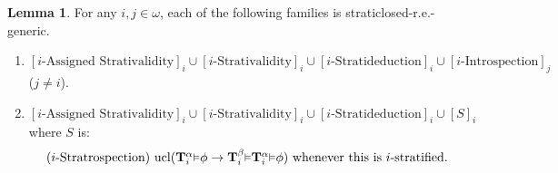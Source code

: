 \documentclass[reqno]{article}
\theoremstyle{definition}
\newtheorem{lemma}[theorem]{Lemma}
\def\T{\mathbf{T}}
\newcommand{\Prr}[2]{\T^{#1}_{#2}\mbox{\small${\vDash}$}}
\newcommand{\ucl}[1]{\mathrm{ucl}(#1)}
\begin{document}
\begin{lemma}
\label{secondutilbagintrospection}
For any $i,j\in\omega$, each of the following families is straticlosed-r.e.-generic.
\begin{enumerate}
\item $[\mbox{$i$-Assigned Strativalidity}]_i \cup [\mbox{$i$-Strativalidity}]_i \cup [\mbox{$i$-Stratideduction}]_i
\cup [\mbox{$i$-Introspection}]_j$ ($j\not=i$).
\item $[\mbox{$i$-Assigned Strativalidity}]_i \cup [\mbox{$i$-Strativalidity}]_i \cup [\mbox{$i$-Stratideduction}]_i
\cup [S]_i$ where $S$ is:
\[\mbox{($i$-Stratrospection) $\ucl{\Prr\alpha i\phi\rightarrow \Prr\beta
i\Prr\alpha i\phi}$
whenever this is $i$-stratified.}\]
\end{enumerate}
\end{lemma}
\end{document}
